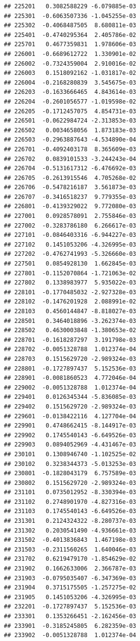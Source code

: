 \begin{frame}[fragile]
\begin{verbatim}
## 225201   0.3082588229 -6.079885e-03
## 225301  -0.6063507336 -1.045255e-03
## 225302  -0.4068487505  8.680811e-03
## 225401  -0.4740295364  2.405786e-02
## 225701   0.4677359831  1.978606e-03
## 226001  -0.6689612722  1.330901e-02
## 226002  -0.7324359004  2.910016e-02
## 226003   0.1518092162 -1.031817e-02
## 226004  -0.2168280839  3.545675e-03
## 226203  -0.1633666465  4.843614e-03
## 226204  -0.2601056577 -1.019598e-02
## 226205  -0.1712457075  4.854731e-03
## 226501  -0.0622984724 -2.313853e-03
## 226502   0.0034658056  1.873183e-03
## 226503  -0.2963887643 -4.534890e-04
## 226701  -0.4092403178  8.365609e-03
## 226702   0.0839101533 -3.244243e-04
## 226704  -0.5131617312 -6.476692e-03
## 226705  -0.2613915546  4.705268e-02
## 226706  -0.5478216187  3.561873e-03
## 226707  -0.3416518237  9.779355e-03
## 226801  -0.4139329022  9.772080e-03
## 227001   0.0928578091  2.755846e-03
## 227002  -0.3283786180  6.266617e-03
## 227101  -0.0846403316 -6.944227e-03
## 227102   0.1451053206 -4.326995e-03
## 227202  -0.4762741993 -5.326660e-03
## 227501   0.0854928130  1.662845e-03
## 227801  -0.1152070864 -1.721063e-02
## 227802   0.1338983977  5.935022e-03
## 228101  -0.1770485032 -2.927328e-03
## 228102  -0.1476201928  2.088991e-02
## 228103   0.4560144847 -8.818027e-03
## 228501   0.3464018896 -3.262374e-03
## 228502   0.4630003848 -1.380653e-02
## 228701  -0.1618287297  3.191798e-03
## 228702  -0.0051328788  1.012374e-04
## 228703   0.1515629720 -2.989324e-03
## 228801  -0.1727897437  5.152536e-03
## 228901  -0.0081860523  4.772046e-04
## 229002  -0.0051328788  1.012374e-04
## 229401   0.0126345344 -5.836085e-03
## 229402   0.1515629720 -2.989324e-03
## 229601  -0.0138422116  4.127704e-04
## 229901   0.4748662415 -8.144917e-03
## 229902   0.1745540143 -6.649526e-03
## 229903   0.0894052969 -4.431467e-03
## 230101   0.1308946740 -1.102525e-02
## 230102   0.3238344373 -5.013253e-03
## 230801  -0.1828043179  6.757589e-03
## 230802   0.1515629720 -2.989324e-03
## 231101   0.0735012952 -8.330394e-03
## 231102   0.2748901970 -4.827316e-03
## 231103   0.1745540143 -6.649526e-03
## 231301   0.2124324322 -8.280737e-03
## 231302   0.2030541490 -4.936661e-03
## 231502  -0.4013836843  1.467198e-03
## 231503  -0.2311560265  1.640046e-03
## 231702   0.6219479170 -1.854629e-02
## 231902   0.1662633006  2.366787e-03
## 231903  -0.0795035407 -6.347369e-03
## 231904   0.3715175505 -1.257275e-02
## 231905   0.1451053206 -4.326995e-03
## 232201  -0.1727897437  5.152536e-03
## 233301   0.1353266451 -2.162456e-03
## 233901  -0.3185245805  6.282359e-03
## 233902  -0.0051328788  1.012374e-04

\end{verbatim}
\end{frame}
